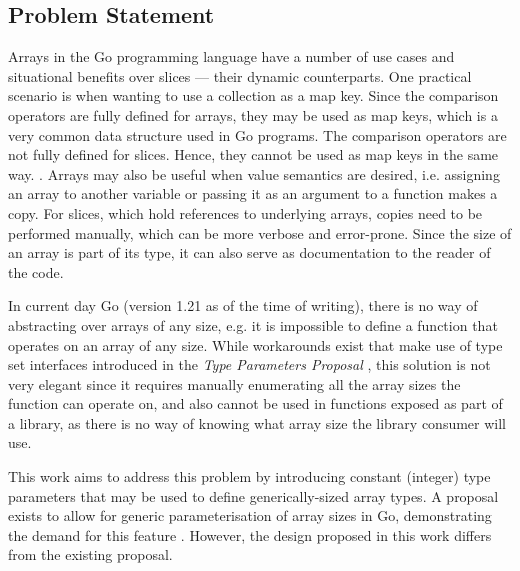 

\subsection{Problem Statement}

Arrays in the Go programming language have a number of use cases and situational
benefits over slices --- their dynamic counterparts. One practical scenario is
when wanting to use a collection as a map key. Since the comparison operators
are fully defined for arrays, they may be used as map keys, which is a very
common data structure used in Go programs. The comparison operators are not
fully defined for slices. Hence, they cannot be used as map keys in the same way.
\autocite{spec}. Arrays may also be useful when value semantics are desired,
i.e. assigning an array to another variable or passing it as an argument to a
function makes a copy. For slices, which hold references to underlying arrays,
copies need to be performed manually, which can be more verbose and error-prone.
Since the size of an array is part of its type, it can also serve as
documentation to the reader of the code.

In current day Go (version 1.21 as of the time of writing), there is no way of
abstracting over arrays of any size, e.g. it is impossible to define a function
that operates on an array of any size. While workarounds exist that make use of
type set interfaces introduced in the \emph{Type Parameters Proposal}
\autocite{genericsProposal}, this solution is not very elegant since it requires
manually enumerating all the array sizes the function can operate on, and also
cannot be used in functions exposed as part of a library, as there is no way of
knowing what array size the library consumer will use.

This work aims to address this problem by introducing constant (integer) type
parameters that may be used to define generically-sized array types. A proposal
exists to allow for generic parameterisation of array sizes in Go, demonstrating
the demand for this feature \autocite{goArrayProposal}. However, the design
proposed in this work differs from the existing proposal.


